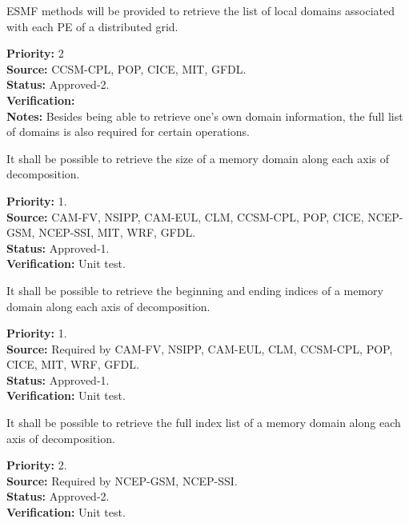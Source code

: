 
ESMF methods will be provided to retrieve the list of local
domains associated with each PE of a distributed grid.

\begin{reqlist}
{\bf Priority:} 2 \\
{\bf Source:} CCSM-CPL, POP, CICE, MIT, GFDL. \\
{\bf Status:} Approved-2. \\
{\bf Verification:} \\
{\bf Notes:} Besides being able to retrieve one's own domain
  information, the full list of domains is also required for certain
  operations.
\end{reqlist}



It shall be possible to retrieve the size of a memory domain
along each axis of decomposition.

\begin{reqlist}
{\bf Priority:} 1. \\ 
{\bf Source:} CAM-FV, NSIPP, CAM-EUL, CLM, CCSM-CPL, POP, CICE, NCEP-GSM, NCEP-SSI, MIT, WRF, GFDL. \\
{\bf Status:} Approved-1. \\
{\bf Verification:} Unit test.
\end{reqlist}


It shall be possible to retrieve the beginning and ending indices of a
memory domain along each axis of decomposition.

\begin{reqlist}
{\bf Priority:} 1. \\
{\bf Source:} Required by CAM-FV, NSIPP, CAM-EUL, CLM, CCSM-CPL, POP, CICE, MIT, WRF, GFDL. \\
{\bf Status:} Approved-1. \\
{\bf Verification:} Unit test.
\end{reqlist}


It shall be possible to retrieve the full index list of a
memory domain along each axis of decomposition.

\begin{reqlist}
{\bf Priority:} 2. \\ 
{\bf Source:} Required by NCEP-GSM, NCEP-SSI. \\
{\bf Status:} Approved-2. \\
{\bf Verification:} Unit test.
\end{reqlist}

